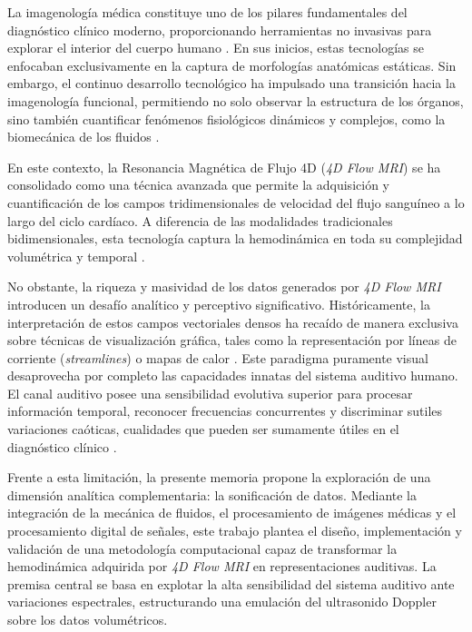 
La imagenología médica constituye uno de los pilares fundamentales del diagnóstico clínico moderno, proporcionando herramientas no invasivas para explorar el interior del cuerpo humano \cite{ELLIOTT20051}. En sus inicios, estas tecnologías se enfocaban exclusivamente en la captura de morfologías anatómicas estáticas. Sin embargo, el continuo desarrollo tecnológico ha impulsado una transición hacia la imagenología funcional, permitiendo no solo observar la estructura de los órganos, sino también cuantificar fenómenos fisiológicos dinámicos y complejos, como la biomecánica de los fluidos \cite{Antiga2008}.


En este contexto, la Resonancia Magnética de Flujo 4D (\textit{4D Flow MRI}) se ha consolidado como una técnica avanzada que permite la adquisición y cuantificación de los campos tridimensionales de velocidad del flujo sanguíneo a lo largo del ciclo cardíaco. A diferencia de las modalidades tradicionales bidimensionales, esta tecnología captura la hemodinámica en toda su complejidad volumétrica y temporal \cite{markl2012_4dflow}.


No obstante, la riqueza y masividad de los datos generados por \textit{4D Flow MRI} introducen un desafío analítico y perceptivo significativo. Históricamente, la interpretación de estos campos vectoriales densos ha recaído de manera exclusiva sobre técnicas de visualización gráfica, tales como la representación por líneas de corriente (\textit{streamlines}) o mapas de calor \cite{https://doi.org/10.1111/cgf.13394}. Este paradigma puramente visual desaprovecha por completo las capacidades innatas del sistema auditivo humano. El canal auditivo posee una sensibilidad evolutiva superior para procesar información temporal, reconocer frecuencias concurrentes y discriminar sutiles variaciones caóticas, cualidades que pueden ser sumamente útiles en el diagnóstico clínico \cite{article}.


Frente a esta limitación, la presente memoria propone la exploración de una dimensión analítica complementaria: la sonificación de datos. Mediante la integración de la mecánica de fluidos, el procesamiento de imágenes médicas y el procesamiento digital de señales, este trabajo plantea el diseño, implementación y validación de una metodología computacional capaz de transformar la hemodinámica adquirida por \textit{4D Flow MRI} en representaciones auditivas. La premisa central se basa en explotar la alta sensibilidad del sistema auditivo ante variaciones espectrales, estructurando una emulación del ultrasonido Doppler sobre los datos volumétricos.

